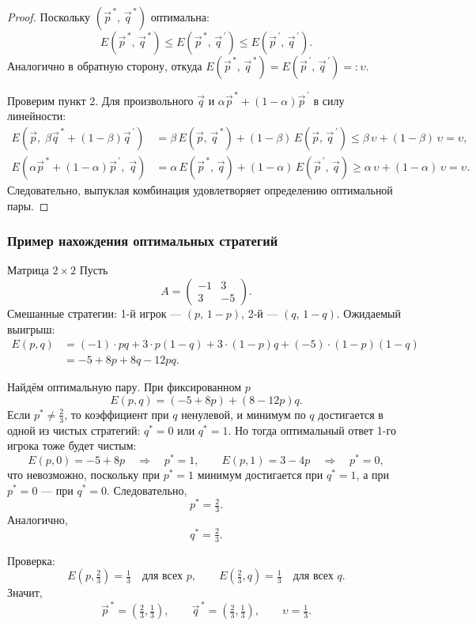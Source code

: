 \begin{proof}
Поскольку $(\vec{p}^{\,*},\, \vec{q}^{\,*})$ оптимальна:
\[
E(\vec{p}^{\,*},\, \vec{q}^{\,*}) \leq E(\vec{p}^{\,*},\, \vec{q}^{\,\prime}) \leq E(\vec{p}^{\,\prime},\, \vec{q}^{\,\prime}).
\]
Аналогично в обратную сторону, откуда $E(\vec{p}^{\,*},\, \vec{q}^{\,*}) = E(\vec{p}^{\,\prime},\, \vec{q}^{\,\prime}) =: \upsilon$.

Проверим пункт 2. Для произвольного $\vec{q}$ и $\alpha\vec{p}^{\,*} + (1-\alpha)\vec{p}^{\,\prime}$ в силу линейности:
\begin{align*}
	E\!\left(\vec{p},\; \beta\vec{q}^{\,*} + (1-\beta)\vec{q}^{\,\prime}\right)
	&= \beta\,E(\vec{p},\,\vec{q}^{\,*}) + (1-\beta)\,E(\vec{p},\,\vec{q}^{\,\prime})
	\leq \beta\,\upsilon + (1-\beta)\,\upsilon = \upsilon, \\[4pt]
	E\!\left(\alpha\vec{p}^{\,*} + (1-\alpha)\vec{p}^{\,\prime},\; \vec{q}\right)
	&= \alpha\,E(\vec{p}^{\,*},\,\vec{q}) + (1-\alpha)\,E(\vec{p}^{\,\prime},\,\vec{q})
	\geq \alpha\,\upsilon + (1-\alpha)\,\upsilon = \upsilon.
\end{align*}
Следовательно, выпуклая комбинация удовлетворяет определению оптимальной пары.
\end{proof}

\subsubsection*{Пример нахождения оптимальных стратегий}

\begin{Example}{Матрица $2\times 2$}{}
	Пусть
	\[
	A = \begin{pmatrix} -1 & 3 \\ 3 & -5 \end{pmatrix}.
	\]
	Смешанные стратегии: 1-й игрок --- $(p,\,1-p)$, 2-й --- $(q,\,1-q)$. Ожидаемый выигрыш:
	\begin{align*}
		E(p,q) &= (-1)\cdot pq + 3\cdot p(1-q) + 3\cdot(1-p)q + (-5)\cdot(1-p)(1-q) \\
		&= -5 + 8p + 8q - 12pq.
	\end{align*}
	
	Найдём оптимальную пару. При фиксированном $p$
	\[
	E(p,q)=(-5+8p)+(8-12p)q.
	\]
	Если $p^* \neq \tfrac23$, то коэффициент при $q$ ненулевой, и минимум по $q$ достигается в одной из чистых стратегий: $q^*=0$ или $q^*=1$.
	Но тогда оптимальный ответ 1-го игрока тоже будет чистым:
	\[
	E(p,0)=-5+8p \quad \Rightarrow \quad p^*=1,
	\qquad
	E(p,1)=3-4p \quad \Rightarrow \quad p^*=0,
	\]
	что невозможно, поскольку при $p^*=1$ минимум достигается при $q^*=1$, а при $p^*=0$ --- при $q^*=0$.
	Следовательно,
	\[
	p^*=\tfrac23.
	\]
	Аналогично,
	\[
	q^*=\tfrac23.
	\]
	
	Проверка:
	\[
	E\!\left(p,\tfrac23\right)=\tfrac13 \quad \text{для всех } p,
	\qquad
	E\!\left(\tfrac23,q\right)=\tfrac13 \quad \text{для всех } q.
	\]
	Значит,
	\[
	\vec p^{\,*}=\left(\tfrac23,\tfrac13\right), \qquad
	\vec q^{\,*}=\left(\tfrac23,\tfrac13\right), \qquad
	\upsilon=\tfrac13.
	\]
\end{Example}

